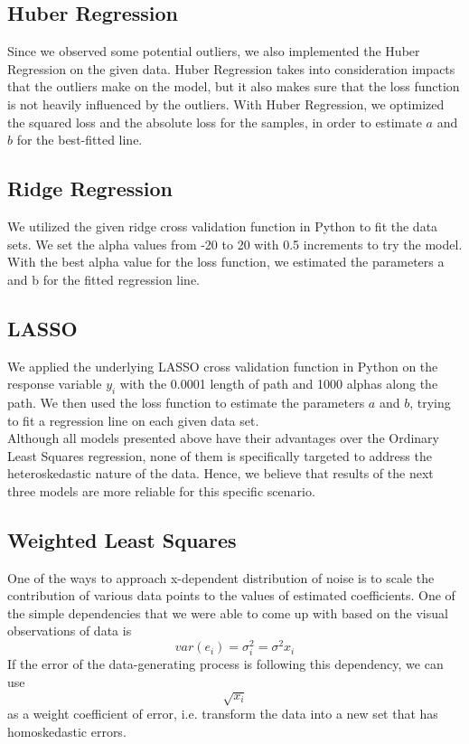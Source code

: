 \documentclass[letter,12pt]{article} %
\begin{document}
	\subsection*{Huber Regression}
	
	Since we observed some potential outliers, we also implemented the Huber Regression on the given data. Huber Regression takes into consideration impacts that the outliers make on the model, but it also makes sure that the loss function is not heavily influenced by the outliers. With Huber Regression, we optimized the squared loss and the absolute loss for the samples, in order to estimate $a$ and $b$ for the best-fitted line.
	
	\subsection*{Ridge Regression}
	
	We utilized the given ridge cross validation function in Python to fit the data sets. We set the alpha values from -20 to 20 with 0.5 increments to try the model. With the best alpha value for the loss function, we estimated the parameters a and b for the fitted regression line.
	
	\subsection*{LASSO}
	
	We applied the underlying LASSO cross validation function in Python on the response variable $y_i$ with the 0.0001 length of path and 1000 alphas along the path. We then used the loss function to estimate the parameters $a$ and $b$, trying to fit a regression line on each given data set.\\
	
	Although all models presented above have their advantages over the Ordinary Least Squares regression, none of them is specifically targeted to address the heteroskedastic nature of the data. Hence, we believe that results of the next three models are more reliable for this specific scenario.
	
	\subsection*{Weighted Least Squares}
	One of the ways to approach x-dependent distribution of noise is to scale the contribution of various data points to the values of estimated coefficients. One of the simple dependencies that we were able to come up with based on the visual observations of data is 
	$$
	var(e_i) = \sigma^2_i = \sigma^2 x_i
	$$
	If the error of the data-generating process is following this dependency, we can use 
	$$
	\sqrt{x_i}
	$$
	as a weight coefficient of error, i.e. transform the data into a new set that has homoskedastic errors.
	
\end{document}
